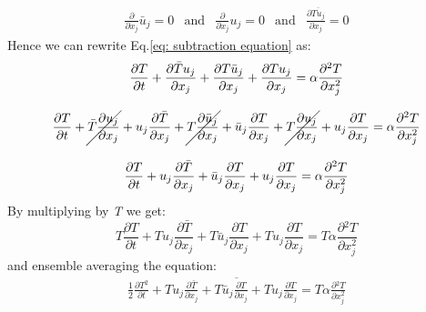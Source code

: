 \documentclass[11pt, a4paper]{article}
\newcommand{\parder}[2]{\frac{\partial {#1}}{\partial {#2}}}
\begin{document}
\begin{equation}
    \begin{matrix}
        \displaystyle\parder{}{x_j}\bar{u}_j=0 & \text{and} & \displaystyle\parder{}{x_j}u_j=0 & \text{and} & \displaystyle\parder{\overline{Tu_j}}{x_j}=0
    \end{matrix}
\end{equation}
Hence we can rewrite Eq.\ref{eq: subtraction equation} as:
\begin{equation}
    \begin{array}{c}
        \displaystyle \parder{T}{t}+\parder{\bar{T}u_j}{x_j}+\parder{T\bar{u}_j}{x_j}+\parder{Tu_j}{x_j}=\alpha\parder{^2T}{x^2_j} \\\\
        \displaystyle \parder{T}{t}+\cancel{\bar{T}\parder{u_j}{x_j}}+u_j\parder{\bar{T}}{x_j}+\cancel{T\parder{\bar{u}_j}{x_j}}+\bar{u}_j\parder{T}{x_j}+\cancel{T\parder{u_j}{x_j}}+u_j\parder{T}{x_j}=\alpha\parder{^2T}{x^2_j} \\\\
        \displaystyle \parder{T}{t}+u_j\parder{\bar{T}}{x_j}+\bar{u}_j\parder{T}{x_j}+u_j\parder{T}{x_j}=\alpha\parder{^2T}{x^2_j}
    \end{array}
\end{equation}
By multiplying by \emph{T} we get:
\begin{equation}
    \displaystyle T\parder{T}{t}+Tu_j\parder{\bar{T}}{x_j}+T\bar{u}_j\parder{T}{x_j}+Tu_j\parder{T}{x_j}=T\alpha\parder{^2T}{x^2_j}
\end{equation}
and ensemble averaging the equation:
\begin{equation}
    \begin{array}{c}
        \overline{\displaystyle \frac{1}{2}\parder{T^2}{t}+Tu_j\parder{\bar{T}}{x_j}+T\bar{u}_j\parder{T}{x_j}+Tu_j\parder{T}{x_j}=T\alpha\parder{^2T}{x^2_j}}
    \end{array}
\end{equation}
\end{document}
